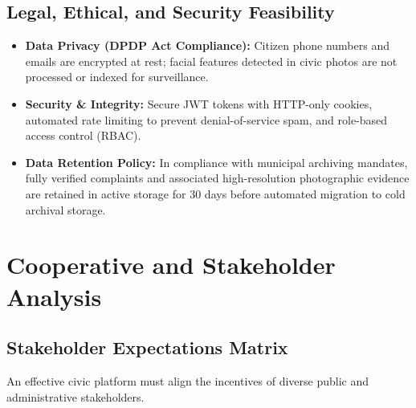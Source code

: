 \documentclass[11pt,a4paper]{article}
\begin{document}
\subsection{Legal, Ethical, and Security Feasibility}
\begin{itemize}[leftmargin=1.5em]
    \item \textbf{Data Privacy (DPDP Act Compliance):} Citizen phone numbers and emails are encrypted at rest; facial features detected in civic photos are not processed or indexed for surveillance.
    \item \textbf{Security \& Integrity:} Secure JWT tokens with HTTP-only cookies, automated rate limiting to prevent denial-of-service spam, and role-based access control (RBAC).
    \item \textbf{Data Retention Policy:} In compliance with municipal archiving mandates, fully verified complaints and associated high-resolution photographic evidence are retained in active storage for 30 days before automated migration to cold archival storage.
\end{itemize}

\section{Cooperative and Stakeholder Analysis}

\subsection{Stakeholder Expectations Matrix}
An effective civic platform must align the incentives of diverse public and administrative stakeholders.
\end{document}
